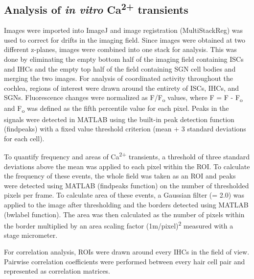 \documentclass[9pt,lineno]{elife}
\begin{document}
\subsection{Analysis of \textit{in vitro} Ca\textsuperscript{2+} transients}
Images were imported into ImageJ and image registration (MultiStackReg) was used to correct for drifts in the imaging field. Since images were obtained at two different z-planes, images were combined into one stack for analysis. This was done by eliminating the empty bottom half of the imaging field containing ISCs and IHCs and the empty top half of the field containing SGN cell bodies and merging the two images. For analysis of coordinated activity throughout the cochlea, regions of interest were drawn around the entirety of ISCs, IHCs, and SGNs. Fluorescence changes were normalized as \textDelta F/F\textsubscript{o} values, where \textDelta F = F - F\textsubscript{o} and F\textsubscript{o} was defined as the fifth percentile value for each pixel. Peaks in the signals were detected in MATLAB using the built-in peak detection function (findpeaks) with a fixed value threshold criterion (mean + 3 standard deviations for each cell).

To quantify frequency and areas of Ca\textsuperscript{2+} transients, a threshold of three standard deviations above the mean was applied to each pixel within the ROI. To calculate the frequency of these events, the whole field was taken as an ROI and peaks were detected using MATLAB (findpeaks function) on the number of thresholded pixels per frame. To calculate area of these events, a Gaussian filter (\textsigma = 2.0) was applied to the image after thresholding and the borders detected using MATLAB (bwlabel function). The area was then calculated as the number of pixels within the border multiplied by an area scaling factor (1\textmu m/pixel)\textsuperscript{2} measured with a stage micrometer. 

For correlation analysis, ROIs were drawn around every IHCs in the field of view. Pairwise correlation coefficients were performed between every hair cell pair and represented as correlation matrices.
\end{document}
